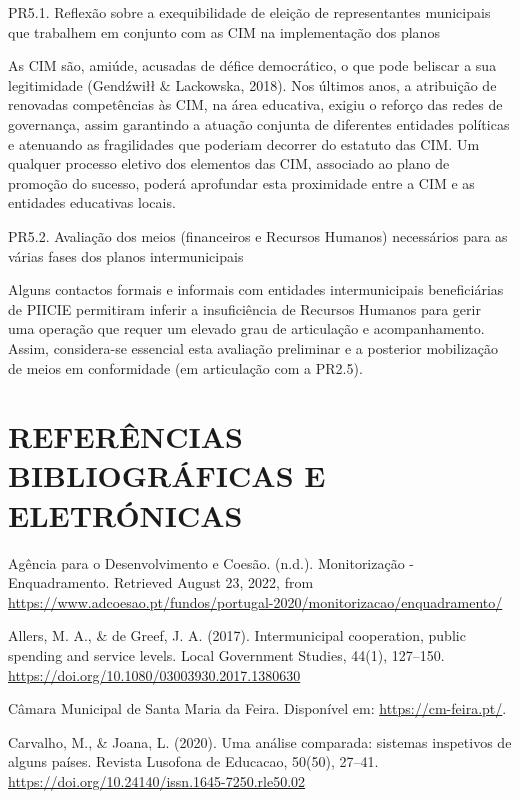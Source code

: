 \documentclass[
]{book}
\begin{document}
\leavevmode{}%
PR5.1. Reflexão sobre a exequibilidade de eleição de representantes municipais que trabalhem em conjunto com as CIM na implementação dos planos

As CIM são, amiúde, acusadas de défice democrático, o que pode beliscar a sua legitimidade (Gendźwiłł \& Lackowska, 2018). Nos últimos anos, a atribuição de renovadas competências às CIM, na área educativa, exigiu o reforço das redes de governança, assim garantindo a atuação conjunta de diferentes entidades políticas e atenuando as fragilidades que poderiam decorrer do estatuto das CIM. Um qualquer processo eletivo dos elementos das CIM, associado ao plano de promoção do sucesso, poderá aprofundar esta proximidade entre a CIM e as entidades educativas locais.

\leavevmode{}%
PR5.2. Avaliação dos meios (financeiros e Recursos Humanos) necessários para as várias fases dos planos intermunicipais

Alguns contactos formais e informais com entidades intermunicipais beneficiárias de PIICIE permitiram inferir a insuficiência de Recursos Humanos para gerir uma operação que requer um elevado grau de articulação e acompanhamento. Assim, considera-se essencial esta avaliação preliminar e a posterior mobilização de meios em conformidade (em articulação com a PR2.5).

\hypertarget{referuxeancias-bibliogruxe1ficas-e-eletruxf3nicas}{%
\chapter*{\texorpdfstring{\textbf{REFERÊNCIAS BIBLIOGRÁFICAS E ELETRÓNICAS}}{REFERÊNCIAS BIBLIOGRÁFICAS E ELETRÓNICAS}}\label{referuxeancias-bibliogruxe1ficas-e-eletruxf3nicas}}

Agência para o Desenvolvimento e Coesão. (n.d.). Monitorização - Enquadramento. Retrieved August 23, 2022, from \url{https://www.adcoesao.pt/fundos/portugal-2020/monitorizacao/enquadramento/}

Allers, M. A., \& de Greef, J. A. (2017). Intermunicipal cooperation, public spending and service levels. Local Government Studies, 44(1), 127--150. \url{https://doi.org/10.1080/03003930.2017.1380630}

Câmara Municipal de Santa Maria da Feira. Disponível em: \url{https://cm-feira.pt/}.

Carvalho, M., \& Joana, L. (2020). Uma análise comparada: sistemas inspetivos de alguns países. Revista Lusofona de Educacao, 50(50), 27--41. \url{https://doi.org/10.24140/issn.1645-7250.rle50.02}
\end{document}
